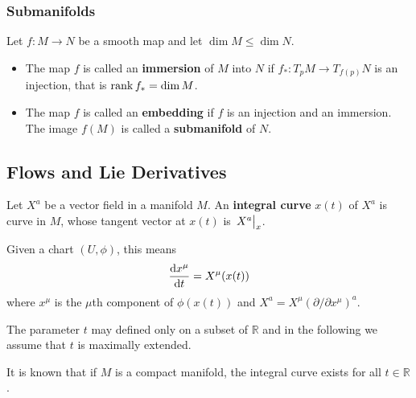 \documentclass[10pt]{article}
\begin{document}
\subsubsection{Submanifolds}
\begin{definition}
    Let $f:M\to N$ be a smooth map and let $\dim M\leq\dim N$.
    \begin{itemize}
        \item The map $f$ is called an \textbf{immersion} of $M$ into $N$ if $f_*:T_pM\to T_{f(p)}N$ is an injection, that is $\rank f_*=\dim M$.
        \item The map $f$ is called an \textbf{embedding} if $f$ is an injection and an immersion.
              The image $f(M)$ is called a \textbf{submanifold} of $N$.
    \end{itemize}
\end{definition}
\subsection{Flows and Lie Derivatives}
\begin{definition}
    Let $X^a$ be a vector field in a manifold $M$.
    An \textbf{integral curve} $x(t)$ of $X^a$ is curve in $M$, whose tangent vector at $x(t)$ is $\eval{X^a}_x$.
\end{definition}
Given a chart $(U,\phi)$, this means
\begin{align}\label{integralcurve}
    \dv{x^\mu}{t}=X^\mu(x(t))
\end{align}
where $x^\mu$ is the $\mu$th component of $\phi(x(t))$ and $X^a=X^\mu (\partial/\partial x^\mu)^a$.
\begin{remark}
    The parameter $t$ may defined only on a subset of $\mathbb{R}$ and in the following we assume that $t$ is maximally extended.

    It is known that if $M$ is a compact manifold, the integral curve exists for all $t\in\mathbb{R}$.
\end{remark}
\end{document}
